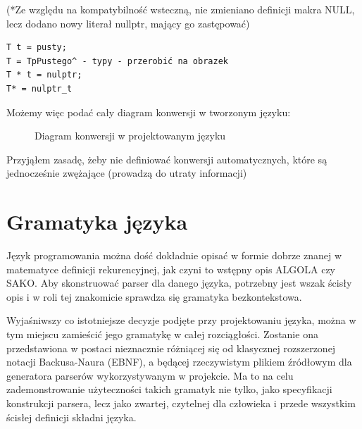 (*Ze względu na kompatybilność wsteczną, nie zmieniano definicji makra NULL, lecz dodano nowy literał nullptr, mający go zastępować)
\begin{lstlisting}
T t = pusty;
T = TpPustego^ - typy - przerobić na obrazek
T * t = nulptr;
T* = nulptr_t
\end{lstlisting}
Możemy więc podać cały diagram konwersji w tworzonym języku:


\begin{figure}[h]
    \centering
    
    \caption{Diagram konwersji w projektowanym języku}
\end{figure}

Przyjąłem zasadę, żeby nie definiować konwersji automatycznych, które są jednocześnie zwężające (prowadzą do utraty informacji)

\section{Gramatyka języka}
Język programowania można dość dokładnie opisać w formie dobrze znanej w matematyce definicji rekurencyjnej, jak czyni to wstępny opis ALGOLA\cite{ALGOL_PRELIMINARY_REPORT} czy SAKO\cite{SAKO}. Aby skonstruować parser dla danego języka, potrzebny jest wszak ścisły opis i w roli tej znakomicie sprawdza się gramatyka bezkontekstowa.

Wyjaśniwszy co istotniejsze decyzje podjęte przy projektowaniu języka, można w tym miejscu zamieścić jego gramatykę w całej rozciągłości.
Zostanie ona przedstawiona w postaci nieznacznie różniącej się od klasycznej rozszerzonej notacji Backusa-Naura (EBNF), a będącej rzeczywistym plikiem źródłowym dla generatora parserów wykorzystywanym w projekcie. Ma to na celu zademonstrowanie użyteczności takich gramatyk nie tylko, jako specyfikacji konstrukcji parsera, lecz jako zwartej, czytelnej dla człowieka i przede wszystkim ścisłej definicji składni języka.

